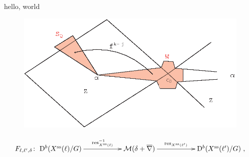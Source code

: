\documentclass{amsart}
\begin{document}
hello, world

\begin{figure}[h]
\includegraphics{graphics.eps}
\end{figure}

\[
F_{\ell, \ell', \delta} \colon \xymatrix{ \mathrm{D}^b(X^{\mathrm{ss}}(\ell) / G) \ar[rr]^-{\operatorname{res}_{X^{\mathrm{ss}}(\ell)}^{-1}} & & \mathcal{M}(\delta + \overline{\nabla}) \ar[rr]^-{\operatorname{res}_{X^{\mathrm{ss}}(\ell')}} & & \mathrm{D}^b(X^{\mathrm{ss}}(\ell')/G)},
\]
\end{document}
